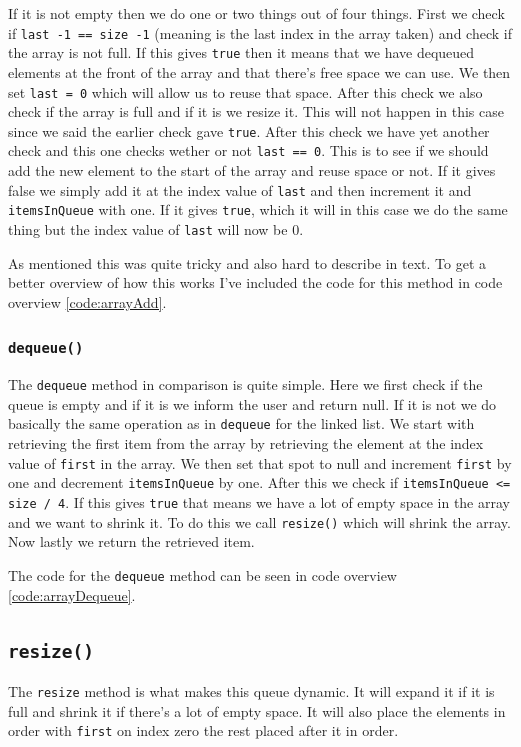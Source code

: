 \documentclass[a4paper,11pt]{article}
\begin{document}
If it is not empty then we do one or two things out of four things. First we check if {\tt last -1 == size -1}
(meaning is the last index in the array taken) and check if the array is not full. If this gives {\tt true} then it
means that we have dequeued elements at the front of the array and that there's free space we can use. We then set
    {\tt last = 0} which will allow us to reuse that space. After this check we also check if the array is full and
if it is we resize it. This will not happen in this case since we said the earlier check gave {\tt true}. After
this check we have yet another check and this one checks wether or not {\tt last == 0}. This is to see if we should
add the new element to the start of the array and reuse space or not. If it gives false we simply add it at the
index value of {\tt last} and then increment it and {\tt itemsInQueue} with one.  If it gives {\tt true}, which it will
in this case we do the same thing but the index value of {\tt last} will now be $0$.

As mentioned this was quite tricky and also hard to describe in text. To get a better overview of how this works I've
included the code for this method in code overview \ref{code:arrayAdd}.

\subsubsection{{\tt dequeue()}}
The {\tt dequeue} method in comparison is quite simple. Here we first check if the queue is empty and if it is we inform
the user and return null. If it is not we do basically the same operation as in {\tt dequeue} for the linked list. We
start with retrieving the first item from the array by retrieving the element at the index value of {\tt first} in
the array. We then set that spot to null and increment {\tt first} by one and decrement {\tt itemsInQueue} by one.
After this we check if {\tt itemsInQueue <= size / 4}. If this gives {\tt true} that means we have a lot of empty space
in the array and we want to shrink it. To do this we call {\tt resize()} which will shrink the array. Now lastly we
return the retrieved item.

The code for the {\tt dequeue} method can be seen in code overview \ref{code:arrayDequeue}.

\subsection{{\tt resize()}}
The {\tt resize} method is what makes this queue dynamic. It will expand it if it is full and shrink it if there's
a lot of empty space. It will also place the elements in order with {\tt first} on index zero the rest placed after it
in order.
\end{document}

